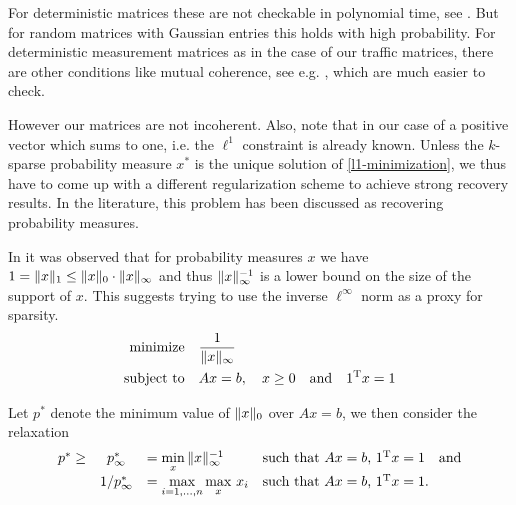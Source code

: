 \documentclass{article} %
\begin{document}
For deterministic matrices these are not checkable in polynomial time, see \cite{DonohoCheckable}. But for random matrices with Gaussian entries this holds with high probability. For deterministic measurement matrices as in the case of our traffic matrices, there are other conditions like mutual coherence, see e.g. \cite{Fuchs}, which are much easier to check.

\begin{theorem}[Incoherence]

\end{theorem}

However our matrices are not incoherent. Also, note that in our case of a positive vector which sums to one, i.e. the $\ell^1$ constraint is already known. Unless the $k$-sparse probability measure $x^*$ is the unique solution of \eqref{l1-minimization}, we thus have to come up with a different regularization scheme to achieve strong recovery results. In the literature, this problem has been discussed as recovering probability measures. 

In \cite{mert} it was observed that for probability measures $x$ we have $1 = \lVert x\rVert_1 \leq \lVert x\rVert_0\cdot \lVert x\rVert_\infty$ and thus $\lVert x\rVert_{\infty}^{-1}$ is a lower bound on the size of the support of $x$. This suggests trying to use the inverse $\ell^\infty$ norm as a proxy for sparsity.
\begin{equation}\label{l8-minimization}
  \begin{split}
    \text{minimize} &\quad \frac{1}{\lVert x\rVert_\infty}\\
    \text{subject to} &\quad Ax = b,\quad x\geq 0\quad\text{and}\quad 1^{\rm T} x = 1
  \end{split}
\end{equation}

Let $p^*$ denote the minimum value of $\lVert x\rVert_0$ over $Ax = b$, we then consider the relaxation
\begin{equation}\label{l8-recovery}
  \begin{array}{rcllllr}
  p^* \geq& p_\infty^* &= \min\limits_x\, \lVert x\rVert_\infty^{-1}&\text{such that $Ax = b$, $1^{\rm T} x = 1$}\quad \text{and}\\[5pt]
  &1/p_\infty^* &= \max\limits_{i=1,\dots,n} \max\limits_{x}\,x_i&\text{such that $Ax = b$, $1^{\rm T} x = 1$.}
  \end{array}
\end{equation}
\end{document}

